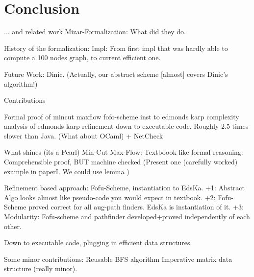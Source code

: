 \documentclass{llncs}
\begin{document}
    

\section{Conclusion} 
  ... and related work
    Mizar-Formalization: What did they do.
    
    History of the formalization: 
      Impl: From first impl that was hardly able to compute a 100 nodes graph, to current efficient one.
    
    Future Work: Dinic. (Actually, our abstract scheme [almost] covers Dinic's algorithm!)
    


  
Contributions

  Formal proof of mincut maxflow
  fofo-scheme
  inst to edmonds karp
  complexity analysis of edmonds karp
  refinement down to executable code. Roughly 2.5 times slower than Java. (What about OCaml)
    + NetCheck
    
What shines (its a Pearl)
  Min-Cut Max-Flow: Textboook like formal reasoning: Comprehensible proof, BUT machine checked
    (Present one (carefully worked) example in paperI. We could use lemma )
    
  Refinement based approach: Fofu-Scheme, instantiation to EdsKa. 
    +1: Abstract Algo looks almost like pseudo-code you would expect in textbook.
    +2: Fofu-Scheme proved correct for all aug-path finders. EdsKa is instantiation of it.
    +3: Modularity: Fofu-scheme and pathfinder developed+proved independently of each other.
  
  Down to executable code, plugging in efficient data structures.
  
Some minor contributions:
  Reusable BFS algorithm
  Imperative matrix data structure (really minor).
  
  
  
    









\end{document}
